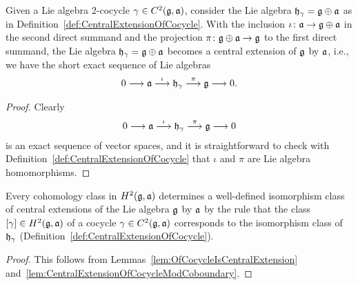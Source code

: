 \begin{lemma}
  \label{lem:OfCocycleIsCentralExtension}
  \leanok
  Given a Lie algebra 2-cocycle $\gamma \in C^2(\mathfrak{g},\mathfrak{a})$,
  consider the Lie algebra $\mathfrak{h}_\gamma = \mathfrak{g} \oplus \mathfrak{a}$ as
  in Definition~\ref{def:CentralExtensionOfCocycle}.
  With the inclusion $\iota \colon \mathfrak{a} \to \mathfrak{g} \oplus \mathfrak{a}$
  in the second direct summand and the
  projection $\pi \colon \mathfrak{g} \oplus \mathfrak{a} \to \mathfrak{g}$ to the first direct
  summand, the Lie algebra $\mathfrak{h}_\gamma = \mathfrak{g} \oplus \mathfrak{a}$ becomes a central
  extension of $\mathfrak{g}$ by $\mathfrak{a}$, i.e., we have the short exact sequence
  of Lie algebras
  \begin{align*}
    0 \longrightarrow \mathfrak{a}
      \overset{\iota}{\longrightarrow} \mathfrak{h}_\gamma
      \overset{\pi}{\longrightarrow} \mathfrak{g}
      \longrightarrow 0 .
  \end{align*}
\end{lemma}
\begin{proof}
  \leanok
  Clearly
  \begin{align*}
    0 \longrightarrow \mathfrak{a}
      \overset{\iota}{\longrightarrow} \mathfrak{h}_\gamma
      \overset{\pi}{\longrightarrow} \mathfrak{g}
      \longrightarrow 0
  \end{align*}
  is an exact sequence of vector spaces, and it is straightforward
  to check with Definition~\ref{def:CentralExtensionOfCocycle}
  that $\iota$ and $\pi$ are Lie algebra homomorphisms.
\end{proof}

\begin{theorem}[]
  \label{thm:CentralExtensionOfCohomologyClass}
  Every cohomology class in $H^2(\mathfrak{g}, \mathfrak{a})$ determines a well-defined
  isomorphism class of central extensions of the Lie algebra $\mathfrak{g}$
  by $\mathfrak{a}$ by the rule that the class $[\gamma] \in H^2(\mathfrak{g}, \mathfrak{a})$ of
  a cocycle $\gamma \in C^2(\mathfrak{g}, \mathfrak{a})$ corresponds to the isomorphism
  class of $\mathfrak{h}_\gamma$ (Definition~\ref{def:CentralExtensionOfCocycle}).
\end{theorem}
\begin{proof}
  This follows from Lemmas~\ref{lem:OfCocycleIsCentralExtension}
  and~\ref{lem:CentralExtensionOfCocycleModCoboundary}.
\end{proof}

